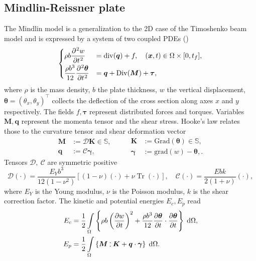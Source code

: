 \documentclass{ifacconf}
\DeclareMathOperator{\Tr}{Tr}
\def\onedot{$\mathsurround0pt\ldotp$}
\def\cddot{%
	\mathbin{\vcenter{\baselineskip.67ex
			\hbox{\onedot}\hbox{\onedot}}%
}}
\begin{document}
\subsection{Mindlin-Reissner plate}
The Mindlin model is a generalization to the 2D case of the Timoshenko beam model and is expressed by a system of two coupled PDEs (\cite{timoshenko1959theory}) 
\begin{equation}
\label{eq:clMin}
\begin{cases}
\displaystyle \rho b \diffp[2]{w}{t} &= \mathrm{div}(\bm{q}) + f, \quad (\bm{x}, t) \in \Omega \times [0, t_f],  \vspace{1mm}\\
\displaystyle \frac{\rho b^3}{12} \diffp[2]{\bm \theta}{t} &= \bm{q} + \mathrm{Div}(\bm M) + \bm{\tau}, \\
\end{cases}
\end{equation}
where $\rho$ is the mass density, $b$ the plate thickness, $w$ the vertical displacement, $\bm \theta = (\theta_x, \theta_y)^\top$ collects the deflection of the cross section along axes $x$ and $y$ respectively. The fields $f, \bm{\tau}$ represent distributed forces and torques. Variables $\bm{M}, \bm{q}$ represent the momenta tensor and the shear stress. Hooke's law relates those to the curvature tensor and shear deformation vector
\begin{equation*}
\begin{aligned}
\bm{M} &:= \mathcal{D} \bm{K} \in \mathbb{S}, \\ \bm{q} &:= \mathcal{C} \bm{\gamma},
\end{aligned} \qquad
\begin{aligned}
\bm{K} &:= \mathrm{Grad}(\bm{\theta}) \in \mathbb{S}, \\ \bm{\gamma} &:= \mathrm{grad}(w) - \bm{\theta},.
\end{aligned}
\end{equation*}
Tensors $\mathcal{D}, \ \mathcal{C}$ are symmetric positive 
\begin{equation}
\label{eq:bend_rig_tensor}
	\mathcal{D} (\cdot) = \frac{E_Y b^3}{12 (1 - \nu^2)}[(1-\nu)(\cdot) + \nu \Tr(\cdot)], \quad \mathcal{C} (\cdot) = \frac{E b k }{2(1+\nu)}(\cdot),
\end{equation}
where $E_Y$ is the Young modulus, $\nu$ is the Poisson modulus, $k$ is the shear correction factor.
 The kinetic and potential energies  $E_c, E_p$ read
\begin{equation}
\begin{aligned}
E_c &=  \frac{1}{2} \int_{\Omega} \left\{ \rho b \left(\diffp{w}{t} \right)^2 +  \frac{\rho b^3}{12} \diffp{\bm{\theta}}{t} \cdot \diffp{\bm{\theta}}{t}  \right\} \d\Omega, \\
E_p &= \frac{1}{2} \int_{\Omega} \left\{ \bm{M} \cddot \bm{K} + \bm{q} \cdot \bm{\gamma}  \right\}\d\Omega.
\end{aligned}
\end{equation} 
\end{document}
